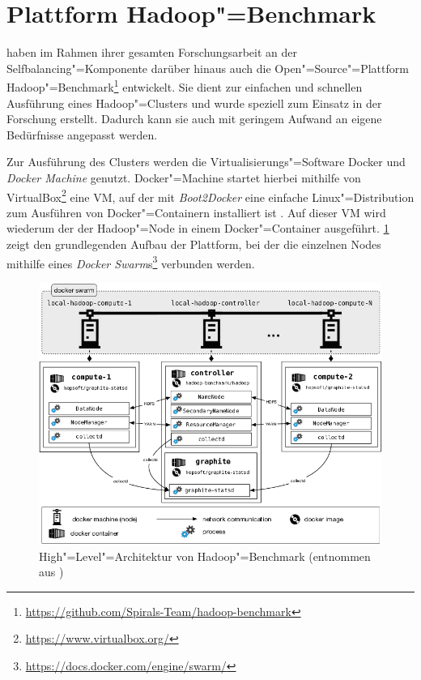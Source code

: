 \section{Plattform Hadoop"=Benchmark}
\label{sec:hadoopBenchmark}

\citeauthor{Zhang2016} haben im Rahmen ihrer gesamten Forschungsarbeit an der Selfbalancing"=Komponente darüber hinaus auch die Open"=Source"=Plattform Hadoop"=Benchmark\footnote{\url{https://github.com/Spirals-Team/hadoop-benchmark}} entwickelt.
Sie dient zur einfachen und schnellen Ausführung eines Hadoop"=Clusters und wurde speziell zum Einsatz in der Forschung erstellt.
Dadurch kann sie auch mit geringem Aufwand an eigene Bedürfnisse angepasst werden.

Zur Ausführung des Clusters werden die Virtualisierungs"=Software Docker und \emph{Docker Machine} genutzt.
Docker"=Machine startet hierbei mithilfe von VirtualBox\footnote{\url{https://www.virtualbox.org/}} eine VM, auf der mit \emph{Boot2Docker} eine einfache Linux"=Distribution zum Ausführen von Docker"=Containern installiert ist \cite{DockerMachineGettingStartedVm}.
Auf dieser VM wird wiederum der der Hadoop"=Node in einem Docker"=Container ausgeführt.
\cref{fig:hadoopBenchmarkArchitecture} zeigt den grundlegenden Aufbau der Plattform, bei der die einzelnen Nodes mithilfe eines \emph{Docker  Swarm}s\footnote{\url{https://docs.docker.com/engine/swarm/}} verbunden werden.

\begin{figure}
    \includegraphics{./resources/hadoopBenchmarkArch.png}
    \caption[High"=Level"=Architektur von Hadoop"=Benchmark]
    {High"=Level"=Architektur von Hadoop"=Benchmark (entnommen aus \cite{abb:hadoopBenchmarkArch})}
    \label{fig:hadoopBenchmarkArchitecture}
\end{figure}

